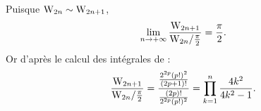 \begin{demo}
    Puisque $\mathrm{W}_{2n} \sim \mathrm{W}_{2n+1}$, 
    $$\lim_{n \to +\infty} \frac{\mathrm{W}_{2n+1}}{\mathrm{W}_{2n} / \frac{\pi}{2}} = \frac{\pi}{2}.$$
    Or d'après le calcul des intégrales de :
    $$\frac{\mathrm{W}_{2n+1}}{\mathrm{W}_{2n} / \frac{\pi}{2}} = \frac{\frac{2^{2p}(p!)^2}{(2p+1)!}}{\frac{(2p)!}{2^{2p}(p!)^2}} = \prod_{k=1}^n \frac{4k^2}{4k^2-1}.$$
\end{demo}









